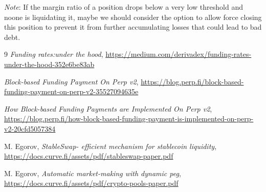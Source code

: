 \documentclass{article}
\begin{document}
\textit{Note}: If the margin ratio of a position drops below a very low threshold and noone is liquidating it, maybe we should consider the option to allow force closing this position to prevent it from further accumulating losses that could lead to bad debt.


\newpage 


\begin{thebibliography}{9}
\emph{Funding rates:under the hood}, 
\url{https://medium.com/derivadex/funding-rates-under-the-hood-352e6be83ab}

\emph{Block-based Funding Payment On Perp v2}, 
\url{https://blog.perp.fi/block-based-funding-payment-on-perp-v2-35527094635e}

\emph{How Block-based Funding Payments are Implemented On Perp v2}, \url{https://blog.perp.fi/how-block-based-funding-payment-is-implemented-on-perp-v2-20cfd5057384}

M. Egorov, \emph{StableSwap- efficient mechanism for stablecoin liquidity}, \url{https://docs.curve.fi/assets/pdf/stableswap-paper.pdf}

M. Egorov, \emph{Automatic market-making with dynamic peg}, \url{https://docs.curve.fi/assets/pdf/crypto-pools-paper.pdf}

\end{thebibliography}
\end{document}
